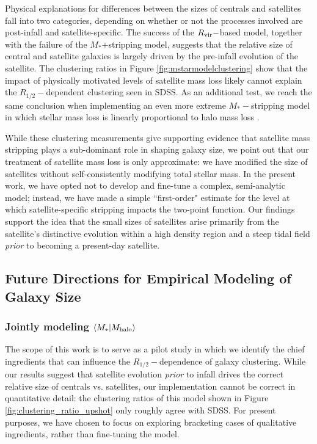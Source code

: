 \documentclass[usenatbib,usegraphicx,letterpaper]{mn2e}
\newcommand{\rhalf}{R_{1/2}}
\newcommand{\mstar}{M_{\ast}}
\newcommand{\mhalo}{M_{\rm halo}}
\newcommand{\rvir}{R_{\rm vir}}
\begin{document}
Physical explanations for differences between the sizes of centrals and satellites fall into two categories, depending on whether or not the processes involved are post-infall and satellite-specific. The success of the $\rvir-$based model, together with the failure of the $\mstar$+stripping model, suggests that the relative size of central and satellite galaxies is largely driven by the {\rm pre-infall} evolution of the satellite. The clustering ratios in Figure \ref{fig:mstarmodelclustering} show that the impact of physically motivated levels of satellite mass loss likely cannot explain the $\rhalf-$dependent clustering seen in SDSS. As an additional test, we reach the same conclusion when implementing an even more extreme $\mstar-$stripping model in which stellar mass loss is linearly proportional to halo mass loss \citep[][Model 1]{watson_etal12}. 
 
While these clustering measurements give supporting evidence that satellite mass stripping plays a sub-dominant role in shaping galaxy size, we point out that our treatment of satellite mass loss is only approximate: we have modified the size of satellites without self-consistently modifying total stellar mass. In the present work, we have opted not to develop and fine-tune a complex, semi-analytic model; instead, we have made a simple ``first-order" estimate for the level at which satellite-specific stripping impacts the two-point function. Our findings support the idea that the small sizes of satellites arise primarily from the satellite's distinctive evolution within a high density region and a steep tidal field {\em prior} to becoming a present-day satellite. 

\subsection{Future Directions for Empirical Modeling of Galaxy Size}
\label{subsec:future}

\subsubsection{Jointly modeling $\langle\mstar\vert\mhalo\rangle$}

The scope of this work is to serve as a pilot study in which we identify the chief ingredients that can influence the $\rhalf-$dependence of galaxy clustering. While our results suggest that satellite evolution {\em prior} to infall drives the correct relative size of centrals vs. satellites, our implementation cannot be correct in quantitative detail: the clustering ratios of this model shown in Figure \ref{fig:clustering_ratio_upshot} only roughly agree with SDSS. For present purposes, we have chosen to focus on exploring bracketing cases of qualitative ingredients, rather than fine-tuning the model.
\end{document}
